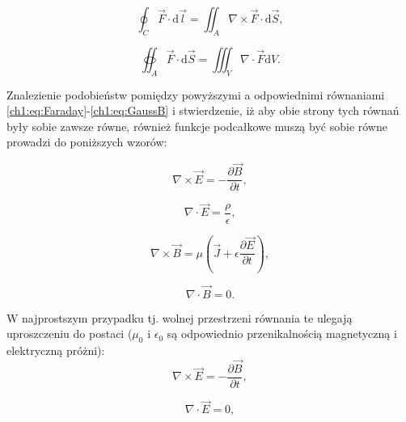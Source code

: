 \begin{equation}
\oint_C\vec{F}\cdot\mathrm{d}\vec{l} = \iint_A\nabla\times\vec{F}\cdot\mathrm{d}\vec{S},
\label{ch1:eq:StokesTheorem}
\end{equation}

\begin{equation}
\oiint_A\vec{F}\cdot\mathrm{d}\vec{S} = \iiint_V\nabla\cdot\vec{F}\mathrm{d}V.
\label{ch1:eq:GaussTheorem}
\end{equation}

Znalezienie podobieństw pomiędzy powyższymi a odpowiednimi równaniami \eqref{ch1:eq:Faraday}-\eqref{ch1:eq:GaussB} i stwierdzenie, iż aby obie strony tych równań były sobie zawsze równe, również funkcje podcałkowe muszą być sobie równe prowadzi do poniższych wzorów:


\begin{equation}
\nabla\times\vec{E} = -\frac{\partial\vec{B}}{\partial t},
\label{ch1:eq:FaradayDiff}
\end{equation}

\begin{equation}
\nabla\cdot\vec{E} = \frac{\rho}{\epsilon},
\label{ch1:eq:GaussDiff}
\end{equation}

\begin{equation}
\nabla\times\vec{B} = \mu\left(\vec{J} + \epsilon\frac{\partial\vec{E}}{\partial t} \right),
\label{ch1:eq:AmpereDiff}
\end{equation}

\begin{equation}
\nabla\cdot\vec{B} = 0.
\label{ch1:eq:GaussBDiff}
\end{equation}

W najprostszym przypadku tj. wolnej przestrzeni równania te ulegają uproszczeniu do postaci ($\mu_0$ i $\epsilon_0$ są odpowiednio przenikalnością magnetyczną i elektryczną próżni):
\begin{equation}
\nabla\times\vec{E} = -\frac{\partial\vec{B}}{\partial t},
\label{ch1:eq:FaradayDiffFree}
\end{equation}

\begin{equation}
\nabla\cdot\vec{E} = 0,
\label{ch1:eq:GaussDiffFree}
\end{equation}

